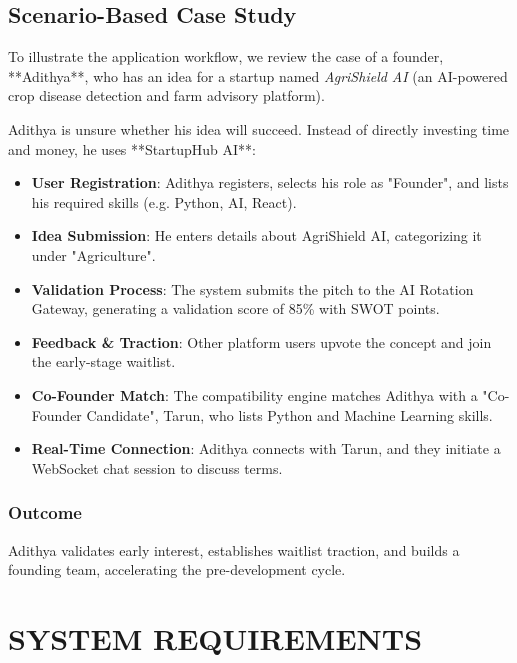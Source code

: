 \documentclass[12pt,a4paper]{report}
\begin{document}
\section{Scenario-Based Case Study}
To illustrate the application workflow, we review the case of a founder, **Adithya**, who has an idea for a startup named \textit{AgriShield AI} (an AI-powered crop disease detection and farm advisory platform). 

Adithya is unsure whether his idea will succeed. Instead of directly investing time and money, he uses **StartupHub AI**:
\begin{itemize}
    \item \textbf{User Registration}: Adithya registers, selects his role as "Founder", and lists his required skills (e.g. Python, AI, React).
    \item \textbf{Idea Submission}: He enters details about AgriShield AI, categorizing it under "Agriculture".
    \item \textbf{Validation Process}: The system submits the pitch to the AI Rotation Gateway, generating a validation score of 85\% with SWOT points.
    \item \textbf{Feedback & Traction}: Other platform users upvote the concept and join the early-stage waitlist.
    \item \textbf{Co-Founder Match}: The compatibility engine matches Adithya with a "Co-Founder Candidate", Tarun, who lists Python and Machine Learning skills.
    \item \textbf{Real-Time Connection}: Adithya connects with Tarun, and they initiate a WebSocket chat session to discuss terms.
\end{itemize}

\subsection{Outcome}
Adithya validates early interest, establishes waitlist traction, and builds a founding team, accelerating the pre-development cycle.

\chapter{SYSTEM REQUIREMENTS}
\end{document}
